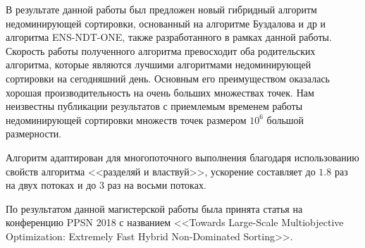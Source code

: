 \startconclusionpage

В результате данной работы был предложен новый гибридный алгоритм недоминирующей сортировки, основанный на алгоритме Буздалова и др и алгоритма ENS-NDT-ONE, также разработанного в рамках данной работы. Скорость работы полученного алгоритма превосходит оба родительских алгоритма, которые являются лучшими алгоритмами недоминирующей сортировки на сегодняшний день. Основным его преимуществом оказалась хорошая производительность на очень больших множествах точек. Нам неизвестны публикации результатов с приемлемым временем работы недоминирующей сортировки множеств точек размером $10^6$ большой размерности.

Алгоритм адаптирован для многопоточного выполнения благодаря использованию свойств алгоритма <<разделяй и властвуй>>, ускорение составляет до $1.8$ раз на двух потоках и до $3$ раз на восьми потоках.

По результатом данной магистерской работы была принята статья на конференцию PPSN 2018 с названием <<Towards Large-Scale Multiobjective Optimization: Extremely Fast Hybrid Non-Dominated Sorting>>. 
